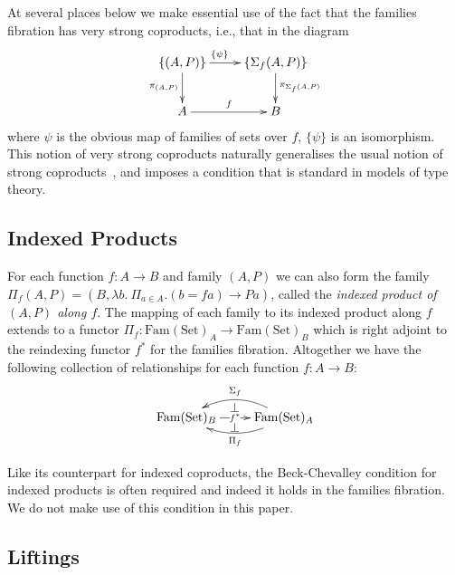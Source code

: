 \documentclass{LMCS}
\newcommand{\Fam}{\mathrm{Fam}}
\newcommand{\Set}{\mathrm{Set}}
\begin{document}
At several places below we make essential use of the fact that the
families fibration has very strong coproducts, i.e., that in the diagram
\begin{equation}\label{eqn:sums-compr}
  \xymatrix{
    {\{(A,P)\}}
    \ar[r]^(.4){\{\psi\}}
    \ar[d]_{\pi_{(A,P)}}
    &
    {\{\Sigma_f (A,P) \}}
    \ar[d]^{\pi_{\Sigma_f (A,P)}}
    \\
    {A}
    \ar[r]^{f}
    &
    {B}
  }
\end{equation}
\noindent
where $\psi$ is the obvious map of families of sets over $f$,
$\{\psi\}$ is an isomorphism. This notion of very strong coproducts
naturally generalises the usual notion of strong
coproducts~\cite{jacobs99book}, and imposes a condition that is
standard in models of type theory.

\subsection{Indexed Products}\label{sec:indexed-products}

For each function $f : A \to B$ and family $(A,P)$ we can also form
the family $\Pi_f(A,P) = (B, \lambda b.\ \Pi_{a \in A}. (b = f a) \to
P a)$, called the {\em indexed product of $(A,P)$ along $f$}.  The
mapping of each family to its indexed product along $f$ extends to a
functor $\Pi_f : \Fam(\Set)_A \to \Fam(\Set)_B$ which is right adjoint
to the reindexing functor $f^*$ for the families fibration. Altogether
we have the following collection of relationships for each function $f
: A \to B$:
\begin{displaymath}
  \xymatrix{
    {\Fam(\Set)_B}
    \save[]+<1.35cm,0.3cm>*{\scriptsize{\perp}}\restore
    \save[]+<1.35cm,-0.25cm>*{\scriptsize{\perp}}\restore
    \ar[r]|{f^*}
    &
    {\Fam(\Set)_A}
    \ar@/_1.2pc/[l]_{\Sigma_f}
    \ar@/^1pc/[l]^{\Pi_f}    
  }
\end{displaymath}

\noindent
Like its counterpart for indexed coproducts, the Beck-Chevalley
condition for indexed products is often required and indeed it holds
in the families fibration. We do not make use of this condition in
this paper.

\subsection{Liftings}\label{sec:fibrational-ind}
\end{document}
